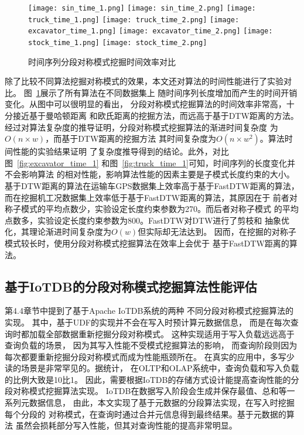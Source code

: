 \begin{figure}
  \centering
  {\texttt{[image: sin\_time\_1.png]}}
  {\texttt{[image: sin\_time\_2.png]}}
  {\texttt{[image: truck\_time\_1.png]}}
  {\texttt{[image: truck\_time\_2.png]}}
  {\texttt{[image: excavator\_time\_1.png]}}
  {\texttt{[image: excavator\_time\_2.png]}}
  {\texttt{[image: stock\_time\_1.png]}}
  {\texttt{[image: stock\_time\_2.png]}}
  \caption{时间序列分段对称模式挖掘时间效率对比}
  \label{fig:segement_algorithm_time}
\end{figure}

除了比较不同算法挖掘对称模式的效果，本文还对算法的时间性能进行了实验对比。
图~\ref{fig:segement_algorithm_time}展示了所有算法在不同数据集上
随时间序列长度增加而产生的时间开销变化。从图中可以很明显的看出，
分段对称模式挖掘算法的时间效率非常高，十分接近基于曼哈顿距离
和欧氏距离的挖掘方法，而远高于基于DTW距离的方法。
经过对算法复杂度的推导证明，分段对称模式挖掘算法的渐进时间复杂度
为$O\left(n \times w\right)$，而基于DTW距离的挖掘方法
其时间复杂度为$O\left(n \times w^2\right)$。算法时间性能的实验结果证明
了复杂度推导得到的结论。此外，对比图~\ref{fig:excavator_time_1}
和图~\ref{fig:truck_time_1}可知，时间序列的长度变化并不会影响算法
的相对性能，影响算法性能的因素主要是子模式长度约束的大小。
基于DTW距离的算法在运输车GPS数据集上效率高于基于FastDTW距离的算法，
而在挖掘机工况数据集上效率低于基于FastDTW距离的算法，其原因在于
前者对称子模式的平均点数少，实验设定长度约束参数为270。而后者对称子模式
的平均点数多，实验设定长度约束参数为800。FastDTW对DTW进行了剪枝和
抽象优化\cite{DBLP:journals/ida/SalvadorC07}，其理论渐进时间复杂度为$O\left(w\right)$但实际却无法达到。
因而，在挖掘的对称子模式较长时，使用分段对称模式挖掘算法在效率上会优于
基于FastDTW距离的算法。

\subsection{基于IoTDB的分段对称模式挖掘算法性能评估}
第4.4章节中提到了基于Apache IoTDB系统的两种
不同分段对称模式挖掘算法的实现。
其中，基于UDF的实现并不会在写入时预计算元数据信息，
而是在每次查询时都加载全部数据重新挖掘分段对称模式。
这种实现适用于写入负载远远高于查询负载的场景，
因为其写入性能不受模式挖掘算法的影响，
而查询阶段则因为每次都要重新挖掘分段对称模式而成为性能瓶颈所在。
在真实的应用中，多写少读的场景是非常罕见的。据统计，
在OLTP和OLAP系统中，查询负载和写入负载的比例大致是10比1。
因此，需要根据IoTDB的存储方式设计能提高查询性能的分段对称模式挖掘算法实现。
IoTDB在数据写入阶段会生成并保存最值、总和等一系列元数据信息，
由此，本文实现了基于元数据的分段算法实现，在写入时挖掘每个分段的
对称模式，在查询时通过合并元信息得到最终结果。基于元数据的算法
虽然会损耗部分写入性能，但其对查询性能的提高非常明显。

